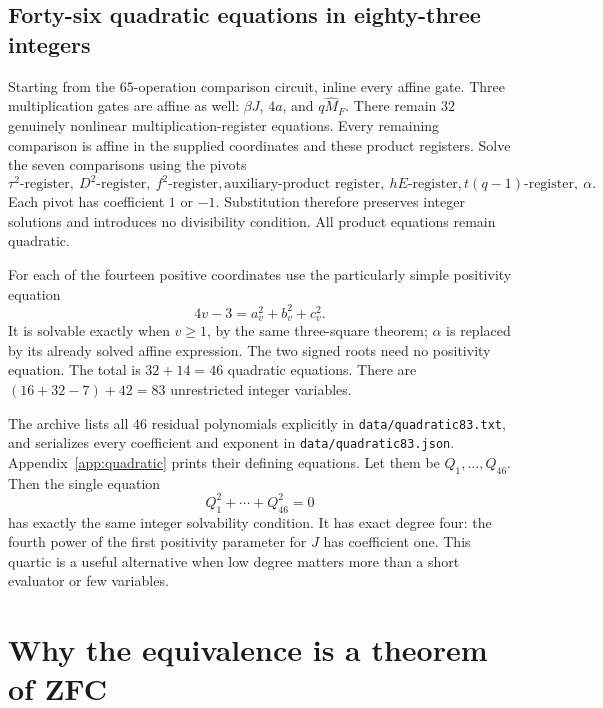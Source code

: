 \documentclass[11pt]{article}
\theoremstyle{remark}\newtheorem{remark}[theorem]{Remark}
\begin{document}
\subsection{Forty-six quadratic equations in eighty-three integers}

Starting from the $65$-operation comparison circuit, inline every
affine gate. Three multiplication gates are affine as well:
$\beta J$, $4a$, and $q\widehat M_F$. There remain $32$
genuinely nonlinear multiplication-register equations.
Every remaining comparison is affine in the supplied coordinates
and these product registers. Solve the seven comparisons using
the pivots
\[
 \tau^2\text{-register},\ D^2\text{-register},\ f^2\text{-register},
 \text{auxiliary-product register},\ hE\text{-register},
 t(q-1)\text{-register},\ \alpha.
\]
Each pivot has coefficient $1$ or $-1$. Substitution therefore
preserves integer solutions and introduces no divisibility condition.
All product equations remain quadratic.

For each of the fourteen positive coordinates use the particularly
simple positivity equation
\begin{equation}\label{eq:positiveeq}
 4v-3=a_v^2+b_v^2+c_v^2.
\end{equation}
It is solvable exactly when $v\ge1$, by the same three-square
theorem; $\alpha$ is replaced by its already solved affine
expression. The two signed roots need no positivity equation.
The total is $32+14=46$ quadratic equations. There are
$(16+32-7)+42=83$ unrestricted integer variables.

The archive lists all $46$ residual polynomials explicitly in
\texttt{data/quadratic83.txt}, and serializes every coefficient
and exponent in \texttt{data/quadratic83.json}. Appendix~\ref{app:quadratic}
prints their defining equations. Let them be $Q_1,\ldots,Q_{46}$.
Then the single equation
\begin{equation}\label{eq:quartic}
 \boxed{\qquad Q_1^2+\cdots+Q_{46}^2=0\qquad}
\end{equation}
has exactly the same integer solvability condition. It has exact
degree four: the fourth power of the first positivity parameter
for $J$ has coefficient one. This quartic is a useful alternative
when low degree matters more than a short evaluator or few variables.

\section{Why the equivalence is a theorem of ZFC}\label{sec:internal}
\end{document}
